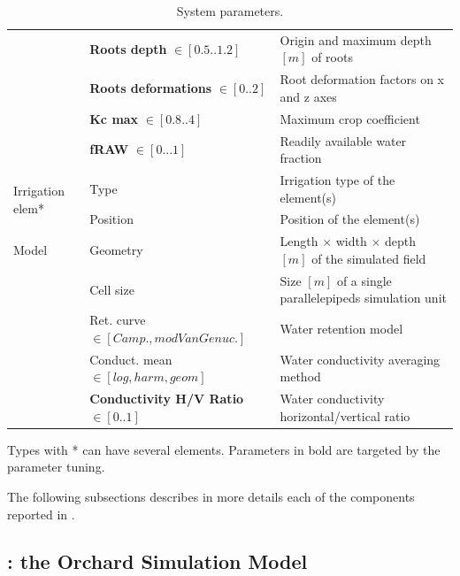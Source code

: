 \begin{table}[H]
\begin{tabular}{p{1.2cm}p{5cm}p{7.5cm}}
		& \textbf{Roots depth} $\in [0.5..1.2]$ &  Origin and maximum depth $[m]$ of roots\\
		& \textbf{Roots deformations} $\in [0..2]$ &  Root deformation factors on x and z axes\\ 
		& \textbf{Kc max} $\in [0.8..4]$ &  Maximum crop coefficient\\
		& \textbf{fRAW} $\in [0...1]$ & Readily available water fraction\\
		\hline%
		\multirow{2}{1cm}{Irrigation elem*} & Type & Irrigation type of the element(s) \\
		& Position & Position of the element(s)\\
		\hline%
		Model & Geometry  & Length $\times$ width $\times$ depth $[m]$ of the simulated field\\
		& Cell size  &  Size $[m]$ of a single parallelepipeds simulation unit\\%
		& Ret. curve $\in [Camp., mod Van Genuc.]$ & Water retention model\\ 
	    & Conduct. mean $\in [log, harm, geom]$ &  Water conductivity averaging method \\ %
		& \textbf{Conductivity H/V Ratio} $\in [0..1]$  &  Water conductivity horizontal/vertical ratio \\
		\bottomrule
	\end{tabular}%
	\begin{tablenotes}
      \scriptsize
      \item Types with * can have several elements. Parameters in bold are targeted by the parameter tuning.
    \end{tablenotes}
	\caption{System parameters.}
	\label{tab:parameter}%
\end{table}%

The following subsections describes in more details each of the components reported in .

\subsection{\olab{}: the Orchard Simulation Model}

